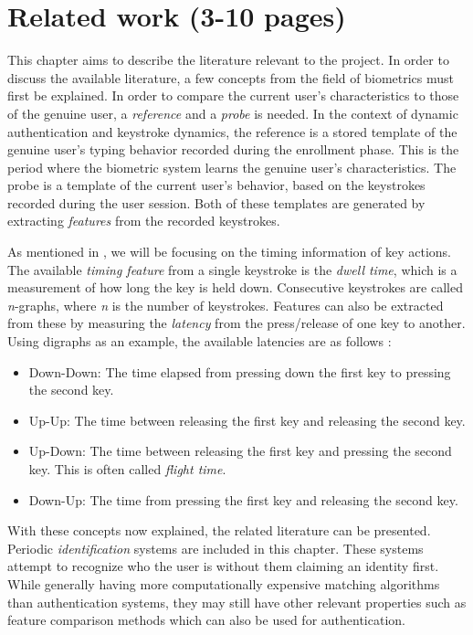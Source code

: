 \documentclass[informationsecurity]{gucmasterproject}
\begin{document}
\chapter{Related work (3-10 pages)}
\label{chap:related}
This chapter aims to describe the literature relevant to the project.
In order to discuss the available literature, a few concepts from the field of biometrics must first be explained.
In order to compare the current user's characteristics to those of the genuine user, a \textit{reference} and a \textit{probe} is needed.
In the context of dynamic authentication and keystroke dynamics, the reference is a stored template of the genuine user's typing behavior recorded during the enrollment phase. 
This is the period where the biometric system learns the genuine user's characteristics.
The probe is a template of the current user's behavior, based on the keystrokes recorded during the user session.
Both of these templates are generated by extracting \textit{features} from the recorded keystrokes.

As mentioned in , we will be focusing on the timing information of key actions.
The available \textit{timing feature} from a single keystroke is the \textit{dwell time}, which is a measurement of how long the key is held down.
Consecutive keystrokes are called \textit{n}-graphs, where \textit{n} is the number of keystrokes.
Features can also be extracted from these by measuring the \textit{latency} from the press/release of one key to another.
Using digraphs as an example, the available latencies are as follows \cite{mondal}:
\begin{itemize}
    \item Down-Down: The time elapsed from pressing down the first key to pressing the second key.
    \item Up-Up: The time between releasing the first key and releasing the second key.
    \item Up-Down: The time between releasing the first key and pressing the second key. This is often called \textit{flight time}.
    \item Down-Up: The time from pressing the first key and releasing the second key.
\end{itemize}

With these concepts now explained, the related literature can be presented.
Periodic \textit{identification} systems are included in this chapter.
These systems attempt to recognize who the user is without them claiming an identity first.
While generally having more computationally expensive matching algorithms than authentication systems, they may still have other relevant properties such as feature comparison methods which can also be used for authentication.
\end{document}
